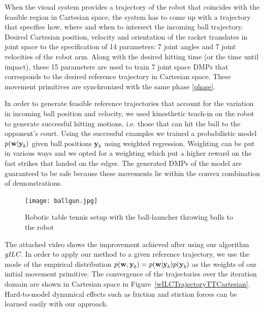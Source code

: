 When the visual system provides a trajectory of the robot that coincides with the feasible region in Cartesian space, the system has to come up with a trajectory that specifies how, where and when to intersect the incoming ball trajectory. Desired Cartesian position, velocity and orientation of the racket translates in joint space to the specification of 14 parameters: 7 joint angles and 7 joint velocities of the robot arm. Along with the desired hitting time (or the time until impact), these 15 parameters are used to train 7 joint space DMPs that corresponds to the desired reference trajectory in Cartesian space. These movement primitives are synchronized with the same phase \eqref{phase}.

In order to generate feasible reference trajectories that account for the variation in incoming ball position and velocity, we used kinesthetic teach-in on the robot to generate successful hitting motions, i.e. those that can hit the ball to the opponent's court. Using the successful examples we trained a probabilistic model $p(\boldsymbol{\mathrm{w}}|\boldsymbol{\mathrm{y}}_b)$ given ball positions $\boldsymbol{\mathrm{y}}_b$ using weighted regression. Weighting can be put in various ways and we opted for a weighting which put a higher reward on the fast strikes that landed on the edges. The generated DMPs of the model are guaranteed to be safe because these movements lie within the convex combination of demonstrations. 



\begin{figure}
\center
\texttt{[image: ballgun.jpg]}			
\caption{Robotic table tennis setup with the ball-launcher throwing balls to the robot}
\label{ballgun}
\end{figure}

The attached video shows the improvement achieved after using our algorithm $\emph{gILC}$. In order to apply our method to a given reference trajectory, we use the mode of the empirical distribution $p(\boldsymbol{\mathrm{w}},\boldsymbol{\mathrm{y}}_b) = p(\boldsymbol{\mathrm{w}}|\boldsymbol{\mathrm{y}}_b)p(\boldsymbol{\mathrm{y}}_b)$ as the weights of our initial movement primitive. The convergence of the trajectories over the iteration domain are shown in Cartesian space in Figure~\ref{wILCTrajectoryTTCartesian}. Hard-to-model dynamical effects such as friction and stiction forces can be learned easily with our approach.

